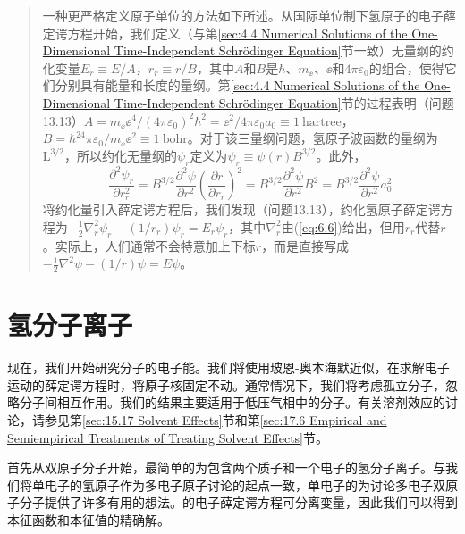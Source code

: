     \begin{quote}
        \small
        \noindent
        一种更严格定义原子单位的方法如下所述。从国际单位制下氢原子的电子薛定谔方程开始，我们定义（与第\ref{sec:4.4 Numerical Solutions of the One-Dimensional Time-Independent Schrödinger Equation}节一致）无量纲的约化变量$E_r \equiv E/A$，$r_r \equiv r/B$，其中$A$和$B$是$\hbar$、$m_{\ee }$、$\ee $和$4\pi\varepsilon_0$的组合，使得它们分别具有能量和长度的量纲。第\ref{sec:4.4 Numerical Solutions of the One-Dimensional Time-Independent Schrödinger Equation}节的过程表明（问题13.13）$A = m_{\ee }\ee ^4/\left(4\pi\varepsilon_0\right)^2\hbar^2 = \ee ^2/4\pi\varepsilon_0a_0 \equiv 1\:\mathrm{hartree}$，$B = \hbar^24\pi\varepsilon_0/m_{\ee }\ee ^2 \equiv 1\:\mathrm{bohr}$。对于该三量纲问题，氢原子波函数的量纲为$\mathrm{L}^{3/2}$，所以约化无量纲的$\psi_r$定义为$\psi_r \equiv \psi\left(r\right)B^{3/2}$。此外，
        \begin{equation*}
            \frac{\partial^2 \psi_r}{\partial r_r^2} = B^{3/2} \frac{\partial^2 \psi}{\partial r^2} \left( \frac{\partial r}{\partial r_r} \right)^2 = B^{3/2} \frac{\partial^2 \psi}{\partial r^2} B^2 = B^{3/2} \frac{\partial^2 \psi}{\partial r^2} a_0^2
        \end{equation*}
        将约化量引入薛定谔方程后，我们发现（问题13.13），约化氢原子薛定谔方程为$-\frac{1}{2}\nabla_r^2\psi_r - \left({1}/{r_r}\right)\psi_r = E_r\psi_r$，其中$\nabla_r^2$由(\ref{eq:6.6})给出，但用$r_r$代替$r$。实际上，人们通常不会特意加上下标$r$，而是直接写成$-\frac{1}{2}\nabla^2\psi - \left({1}/{r}\right)\psi = E\psi$。
    \end{quote}

\section{氢分子离子}
\label{sec:13.4 The Hydrogen Molecular Ion}

    现在，我们开始研究分子的电子能。我们将使用玻恩-奥本海默近似，在求解电子运动的薛定谔方程时，将原子核固定不动。通常情况下，我们将考虑孤立分子，忽略分子间相互作用。我们的结果主要适用于低压气相中的分子。有关溶剂效应的讨论，请参见第\ref{sec:15.17 Solvent Effects}节和第\ref{sec:17.6 Empirical and Semiempirical Treatments of Treating Solvent Effects}节。

    首先从双原子分子开始，最简单的为包含两个质子和一个电子的氢分子离子。与我们将单电子的氢原子作为多电子原子讨论的起点一致，单电子的为讨论多电子双原子分子提供了许多有用的想法。的电子薛定谔方程可分离变量，因此我们可以得到本征函数和本征值的精确解。

